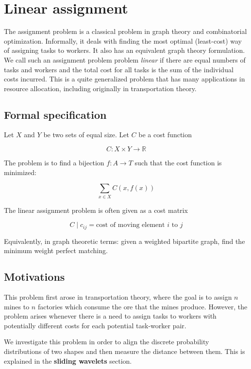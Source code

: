 \documentclass[../tech_report_1.tex]{subfiles}
\begin{document}
\section*{Linear assignment}

The assignment problem is a classical problem in graph theory and combinatorial optimization\cite{burkard1999linear}. Informally, it deals with finding the most optimal (least-cost) way of assigning tasks to workers. It also has an equivalent graph theory formulation. We call such an assignment problem problem \textit{linear} if there are equal numbers of tasks and workers and the total cost for all tasks is the sum of the individual costs incurred. This is a quite generalized problem that has many applications in resource allocation, including originally in transportation theory.

\subsection*{Formal specification}

Let $X$ and $Y$ be two sets of equal size. Let $C$ be a cost function

$$C: X \times Y \rightarrow \mathbb{R}$$

The problem is to find a bijection $f: A \rightarrow T$ such that the cost function is minimized:

$$ \sum_{x \in X} C(x,f(x))$$

The linear assignment problem is often given as a cost matrix

$$ C \mid c_{ij} = \text{cost of moving element } i \text{ to } j$$

Equivalently, in graph theoretic terms: given a weighted bipartite graph, find the minimum weight perfect matching.

\subsection*{Motivations}

This problem first arose in transportation theory, where the goal is to assign $n$ mines to $n$ factories which consume the ore that the mines produce. However, the problem arises whenever there is a need to assign tasks to workers with potentially different costs for each potential task-worker pair.

We investigate this problem in order to align the discrete probability distributions of two shapes and then measure the distance between them. This is explained in the \textbf{sliding wavelets} section.
\end{document}

